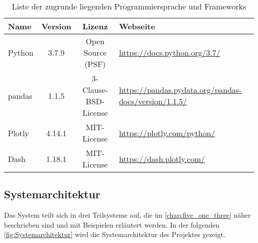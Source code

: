     \begingroup
        \setlength{\tabcolsep}{4pt} %
        \renewcommand{\arraystretch}{1.5}
        \begin{table}[H]
            \centering
            \begin{adjustbox}{max width=\textwidth}
            \Huge
            \begin{tabular}{lccl}
               \toprule
               \textbf{Name}             &{Version}    &\textbf{Lizenz}                        & \textbf{Webseite}\\
               \midrule     
                    Python               &3.7.9         &Open Source (PSF)                     & \url{https://docs.python.org/3.7/}\\
                    pandas               &1.1.5         &3-Clause-BSD-License                  & \url{https://pandas.pydata.org/pandas-docs/version/1.1.5/}\\
                    Plotly               &4.14.1       &MIT-License                           & \url{https://plotly.com/python/}\\
                    Dash                 &1.18.1        &MIT-License                           & \url{https://dash.plotly.com/}\\


                \bottomrule
            \end{tabular}
            \end{adjustbox}
            \caption{%
                Liste der zugrunde liegenden Programmiersprache und Frameworks
            \label{tab:Software-Requirements}
            }
             \end{table}
        \endgroup
    
    \clearpage
    \subsection{Systemarchitektur}
    
    Das System teilt sich in drei Teilsysteme auf, die im \autoref{chap:five_one_three} näher beschrieben sind und mit Beispielen erläutert werden. 
    In der folgenden \autoref{fig:Systemarchitektur} wird die Systemarchitektur des Projektes gezeigt.

